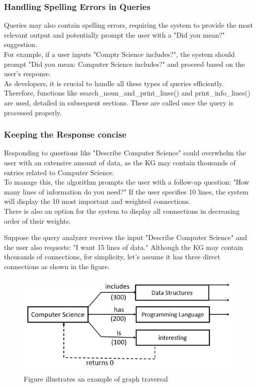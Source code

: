 \documentclass[conference]{IEEEtran}
\begin{document}
\subsubsection{Handling Spelling Errors in Queries}
Queries may also contain spelling errors, requiring the system to provide the most relevant output and potentially prompt the user with a "Did you mean?" suggestion.
\\
For example, if a user inputs "Comptr Science includes?", the system should prompt
"Did you mean: Computer Science includes?" 
and proceed based on the user's response.
\\

As developers, it is crucial to handle all these types of queries efficiently. Therefore, functions like search\_noun\_and\_print\_lines() and print\_info\_lines() are used, detailed in subsequent sections.
These are called once the query is processed properly.
\\

\subsubsection{Keeping the Response concise}

Responding to questions like "Describe Computer Science" could overwhelm the user with an extensive amount of data, as the KG may contain thousands of entries related to Computer Science. \\
To manage this, the algorithm prompts the user with a follow-up question: "How many lines of information do you need?" If the user specifies 10 lines, the system will display the 10 most important and weighted connections. 
\\
There is also an option for the system to display all connections in decreasing order of their weights.


Suppose the query analyzer receives the input "Describe Computer Science" and the user also requests: "I want 15 lines of data."
Although the KG may contain thousands of connections, for simplicity, let's assume it has three direct connections as shown in the figure.

\begin{figure}[htbp]
\centering
\includegraphics[width=1.0\linewidth,height=5cm]{kg_explanation_example.png}
\caption{Figure illustrates an example of graph traversal}
\label{fig}
\end{figure}
\end{document}
